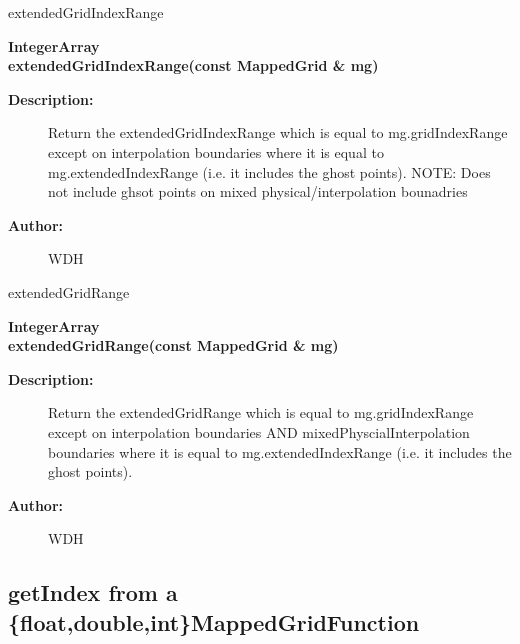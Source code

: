 extendedGridIndexRange
 
\begin{flushleft} \textbf{%
IntegerArray \\ 
\settowidth{\OGgetIndexIncludeArgIndent}{extendedGridIndexRange(}%
extendedGridIndexRange(const MappedGrid \& mg)
}\end{flushleft}
\begin{description}
\item[{\bf Description:}] 
   Return the extendedGridIndexRange which is equal to mg.gridIndexRange except on
  interpolation boundaries where it is equal to mg.extendedIndexRange (i.e. it includes
  the ghost points). NOTE: Does not include ghsot points on mixed physical/interpolation bounadries
\item[{\bf Author:}]  WDH
\end{description}
extendedGridRange
 
\begin{flushleft} \textbf{%
IntegerArray \\ 
\settowidth{\OGgetIndexIncludeArgIndent}{extendedGridRange(}%
extendedGridRange(const MappedGrid \& mg)
}\end{flushleft}
\begin{description}
\item[{\bf Description:}] 
   Return the extendedGridRange which is equal to mg.gridIndexRange except on
  interpolation boundaries AND mixedPhyscialInterpolation boundaries
  where it is equal to mg.extendedIndexRange (i.e. it includes
  the ghost points). 
\item[{\bf Author:}]  WDH
\end{description}
\subsection{getIndex from a \{float,double,int\}MappedGridFunction}
 
